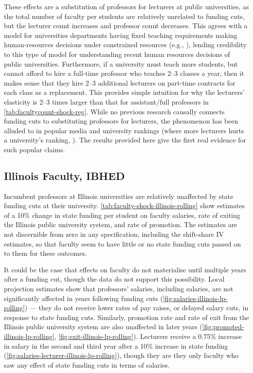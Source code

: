 These effects are a substitution of professors for lecturers at public universities, as the total number of faculty per students are relatively unrelated to funding cuts, but the lecturer count increases and professor count decreases.
This agrees with a model for universities departments having fixed teaching requirements making human-resources decisions under constrained resources (e.g., \citealt{abe2015implications}), lending credibility to this type of model for understanding recent human resources decisions of public universities.
Furthermore, if a university must teach more students, but cannot afford to hire a full-time professor who teaches 2--3 classes a year, then it makes sense that they hire 2--3 additional lecturers on part-time contracts for each class as a replacement.
This provides simple intuition for why the lecturers' elasticity is 2--3 times larger than that for assistant/full professors in \autoref{tab:facultycount-shock-reg}.
While no previous research causally connects funding cuts to substituting professors for lecturers, the phenomenon has been alluded to in popular media \citep{wiu2016} and university rankings (where more lecturers hurts a university's ranking, \citealt{usnews2023}).
The results provided here give the first real evidence for such popular claims.

\subsection{Illinois Faculty, IBHED}
Incumbent professors at Illinois universities are relatively unaffected by state funding cuts at their university.
\autoref{tab:faculty-shock-illinois-rolling} show estimates of a 10\% change in state funding per student on faculty salaries, rate of exiting the Illinois public university system, and rate of promotion.
The estimates are not discernible from zero in any specification, including the shift-share IV estimates, so that faculty seem to have little or no state funding cuts passed on to them for these outcomes.

It could be the case that effects on faculty do not materialise until multiple years after a funding cut, though the data do not support this possibility.
Local projection estimates show that professors' salaries, including salaries, are not significantly affected in years following funding cuts (\autoref{fig:salaries-illinois-lp-rolling}) --- they do not receive lower rates of pay raises, or delayed salary cuts, in response to state funding cuts.
Similarly, promotion rate and rate of exit from the Illinois public university system are also unaffected in later years (\autoref{fig:promoted-illinois-lp-rolling}, \ref{fig:exit-illinois-lp-rolling}).
Lecturers receive a 0.75\% increase in salary in the second and third year after a 10\% increase in state funding (\autoref{fig:salaries-lecturer-illinois-lp-rolling}), though they are they only faculty who saw any effect of state funding cuts in terms of salaries.

